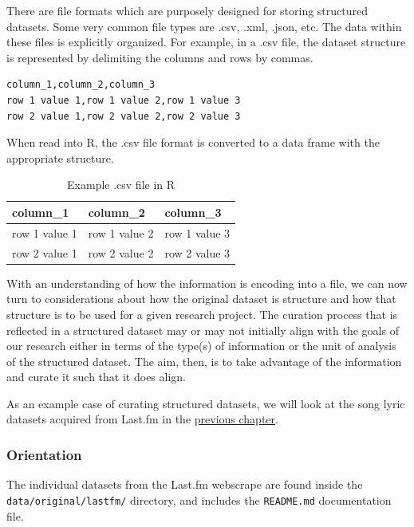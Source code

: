 \documentclass[
]{article}
\begin{document}
There are file formats which are purposely designed for storing structured datasets. Some very common file types are .csv, .xml, .json, etc. The data within these files is explicitly organized. For example, in a .csv file, the dataset structure is represented by delimiting the columns and rows by commas.

\begin{verbatim}
column_1,column_2,column_3
row 1 value 1,row 1 value 2,row 1 value 3
row 2 value 1,row 2 value 2,row 2 value 3
\end{verbatim}

When read into R, the .csv file format is converted to a data frame with the appropriate structure.

\begin{table}

\caption{\label{tab:cd-structured-example-table-csv}Example .csv file in R}
\centering
\begin{tabular}[t]{lll}
\toprule
column\_1 & column\_2 & column\_3\\
\midrule
row 1 value 1 & row 1 value 2 & row 1 value 3\\
row 2 value 1 & row 2 value 2 & row 2 value 3\\
\bottomrule
\end{tabular}
\end{table}

With an understanding of how the information is encoding into a file, we can now turn to considerations about how the original dataset is structure and how that structure is to be used for a given research project. The curation process that is reflected in a structured dataset may or may not initially align with the goals of our research either in terms of the type(s) of information or the unit of analysis of the structured dataset. The aim, then, is to take advantage of the information and curate it such that it does align.

As an example case of curating structured datasets, we will look at the song lyric datasets acquired from Last.fm in the \protect\hyperlink{acquire-data}{previous chapter}.

\hypertarget{orientation-1}{%
\subsubsection{Orientation}\label{orientation-1}}

The individual datasets from the Last.fm webscrape are found inside the \texttt{data/original/lastfm/} directory, and includes the \texttt{README.md} documentation file.
\end{document}
